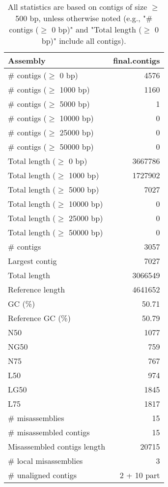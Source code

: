 \documentclass[12pt,a4paper]{article}
\begin{document}
\begin{table}[ht]
\begin{center}
\caption{All statistics are based on contigs of size $\geq$ 500 bp, unless otherwise noted (e.g., "\# contigs ($\geq$ 0 bp)" and "Total length ($\geq$ 0 bp)" include all contigs).}
\begin{tabular}{|l*{1}{|r}|}
\hline
Assembly & final.contigs \\ \hline
\# contigs ($\geq$ 0 bp) & 4576 \\ \hline
\# contigs ($\geq$ 1000 bp) & 1160 \\ \hline
\# contigs ($\geq$ 5000 bp) & 1 \\ \hline
\# contigs ($\geq$ 10000 bp) & 0 \\ \hline
\# contigs ($\geq$ 25000 bp) & 0 \\ \hline
\# contigs ($\geq$ 50000 bp) & 0 \\ \hline
Total length ($\geq$ 0 bp) & 3667786 \\ \hline
Total length ($\geq$ 1000 bp) & 1727902 \\ \hline
Total length ($\geq$ 5000 bp) & 7027 \\ \hline
Total length ($\geq$ 10000 bp) & 0 \\ \hline
Total length ($\geq$ 25000 bp) & 0 \\ \hline
Total length ($\geq$ 50000 bp) & 0 \\ \hline
\# contigs & 3057 \\ \hline
Largest contig & 7027 \\ \hline
Total length & 3066549 \\ \hline
Reference length & 4641652 \\ \hline
GC (\%) & 50.71 \\ \hline
Reference GC (\%) & 50.79 \\ \hline
N50 & 1077 \\ \hline
NG50 & 759 \\ \hline
N75 & 767 \\ \hline
L50 & 974 \\ \hline
LG50 & 1845 \\ \hline
L75 & 1817 \\ \hline
\# misassemblies & 15 \\ \hline
\# misassembled contigs & 15 \\ \hline
Misassembled contigs length & 20715 \\ \hline
\# local misassemblies & 3 \\ \hline
\# unaligned contigs & 2 + 10 part \\ \hline

\end{tabular}
\end{center}
\end{table}
\end{document}
